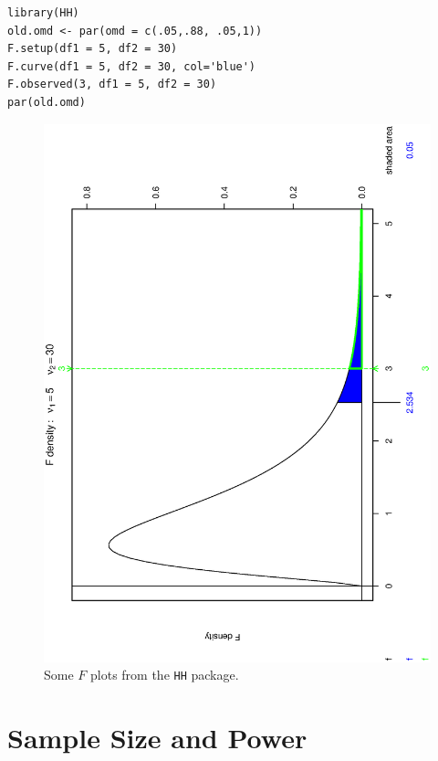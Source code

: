 \documentclass[captions=tableheading]{scrbook}
\begin{document}
\lstset{language=R}
\begin{lstlisting}
library(HH)
old.omd <- par(omd = c(.05,.88, .05,1))
F.setup(df1 = 5, df2 = 30)
F.curve(df1 = 5, df2 = 30, col='blue')
F.observed(3, df1 = 5, df2 = 30)
par(old.omd)
\end{lstlisting}





\begin{figure}[th]
  \includegraphics[angle=270, totalheight=4in]{ps/hypoth/Some-F-plots-HH.ps}
  \caption[Some \(F\) plots from the \texttt{HH} package]{\small Some \(F\) plots from the \texttt{HH} package.}
  \label{fig-Some-F-plots-HH}
\end{figure}
\section{Sample Size and Power}
\label{sec-10-7}
\label{sec-Sample-Size-and-Power}
\end{document}
